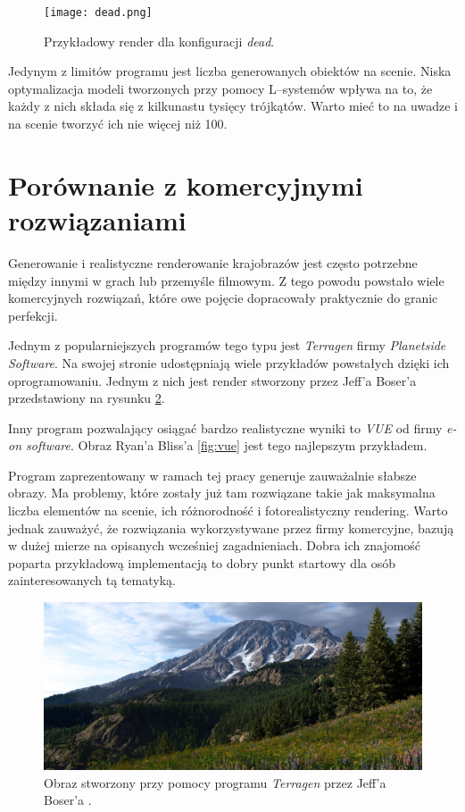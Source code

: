 \documentclass[inz,shortabstract]{iithesis}
\begin{document}
        \begin{figure}[!htbp] 
            \texttt{[image: dead.png]}
            \caption{Przykładowy render dla konfiguracji \textit{dead}.} 
            \label{fig:dead}
        \end{figure}
        
        Jedynym z limitów programu jest liczba generowanych obiektów na scenie. Niska optymalizacja modeli tworzonych przy pomocy L--systemów wpływa na to, że każdy z nich składa się z kilkunastu tysięcy trójkątów. Warto mieć to na uwadze i na scenie tworzyć ich nie więcej niż 100. 
        \newpage
        
    \section{Porównanie z komercyjnymi rozwiązaniami}
        Generowanie i realistyczne renderowanie krajobrazów jest często potrzebne między innymi w grach lub przemyśle filmowym. Z tego powodu powstało wiele komercyjnych rozwiązań, które owe pojęcie dopracowały praktycznie do granic perfekcji. 
        
        Jednym z popularniejszych programów tego typu jest \textit{Terragen} firmy \textit{Planetside Software}. Na swojej stronie udostępniają wiele przykładów powstałych dzięki ich oprogramowaniu. Jednym z nich jest render stworzony przez Jeff'a Boser'a przedstawiony na rysunku \ref{fig:terragen}. 
        
        
        Inny program pozwalający osiągać bardzo realistyczne wyniki to \textit{VUE} od firmy \textit{e-on software}. Obraz Ryan'a Bliss'a \ref{fig:vue} jest tego najlepszym przykładem.
        
        Program zaprezentowany w ramach tej pracy generuje zauważalnie słabsze obrazy. Ma problemy, które zostały już tam rozwiązane takie jak maksymalna liczba elementów na scenie, ich różnorodność i fotorealistyczny rendering. Warto jednak zauważyć, że rozwiązania wykorzystywane przez firmy komercyjne, bazują w dużej mierze na opisanych wcześniej zagadnieniach. Dobra ich znajomość poparta przykładową implementacją to dobry punkt startowy dla osób zainteresowanych tą tematyką. 
                
        \begin{figure}[H] 
            \includegraphics[width=\linewidth]{terragen.png}
            \caption{Obraz stworzony przy pomocy programu \textit{Terragen} przez Jeff'a Boser'a \cite{terragen}.} 
            \label{fig:terragen}
        \end{figure}
        
\end{document}

